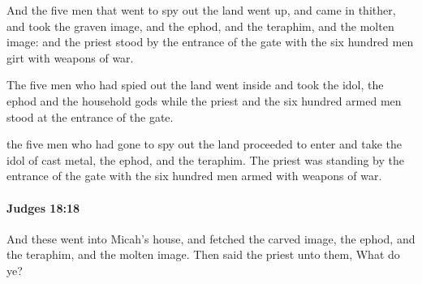 			\begin{versebox}
					\item[BHS] 
					\item[ASV] And the five men that went to spy out the land went up, and came in thither, and took the graven image, and the ephod, and the teraphim, and the molten image: and the priest stood by the entrance of the gate with the six hundred men girt with weapons of war.
					\item[NIV] The five men who had spied out the land went inside and took the idol, the ephod and the household gods while the priest and the six hundred armed men stood at the entrance of the gate.
					\item[NRSV] the five men who had gone to spy out the land proceeded to enter and take the idol of cast metal, the ephod, and the teraphim. The priest was standing by the entrance of the gate with the six hundred men armed with weapons of war.
			\end{versebox}

		\paragraph{Judges 18:18} %
			\label{JUDGES-18-18}

			And these went into Micah’s house, and fetched the carved image, the ephod, and the teraphim, and the molten image. Then said the priest unto them, What do ye?


